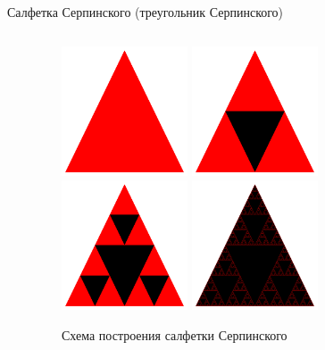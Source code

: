 \documentclass{beamer}
\begin{document}
\begin{frame}{Салфетка Серпинского (треугольник Серпинского)}
\begin{columns}
\begin{column}{0.3\textwidth}
		\end{column}
		\begin{column}{0.7\textwidth}
			\begin{figure}
				\includegraphics[width=0.35\textwidth]{images/1.png}
				\includegraphics[width=0.35\textwidth]{images/2.png}
				\includegraphics[width=0.35\textwidth]{images/3.png}
				\includegraphics[width=0.35\textwidth]{images/10.png}
				\caption{Схема построения салфетки Серпинского}
			\end{figure}
		\end{column}
	\end{columns}

\end{frame}
\end{document}
